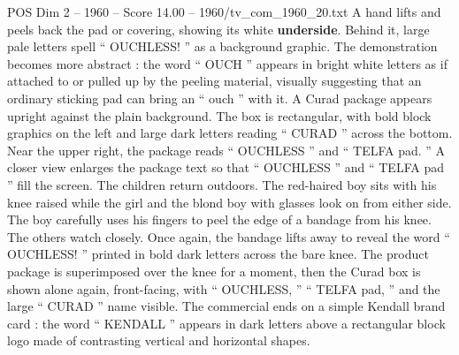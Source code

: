 \begin{textsample}{POS Dim 2 – 1960 – Score 14.00 – 1960/tv\_com\_1960\_20.txt}
A hand lifts and peels back the pad or covering, showing its white \textbf{underside}.
Behind it, large pale letters spell “ OUCHLESS! ” as a background graphic.
The demonstration becomes more abstract : the word “ OUCH ” appears in bright white letters as if attached to or pulled up by the peeling material, visually suggesting that an ordinary sticking pad can bring an “ ouch ” with it.
A Curad package appears upright against the plain background.
The box is rectangular, with bold block graphics on the left and large dark letters reading “ CURAD ” across the bottom.
Near the upper right, the package reads “ OUCHLESS ” and “ TELFA pad. ” A closer view enlarges the package text so that “ OUCHLESS ” and “ TELFA pad ” fill the screen.
The children return outdoors.
The red-haired boy sits with his knee raised while the girl and the blond boy with glasses look on from either side.
The boy carefully uses his fingers to peel the edge of a bandage from his knee.
The others watch closely.
Once again, the bandage lifts away to reveal the word “ OUCHLESS! ” printed in bold dark letters across the bare knee.
The product package is superimposed over the knee for a moment, then the Curad box is shown alone again, front-facing, with “ OUCHLESS, ” “ TELFA pad, ” and the large “ CURAD ” name visible.
The commercial ends on a simple Kendall brand card : the word “ KENDALL ” appears in dark letters above a rectangular block logo made of contrasting vertical and horizontal shapes.

\end{textsample}
